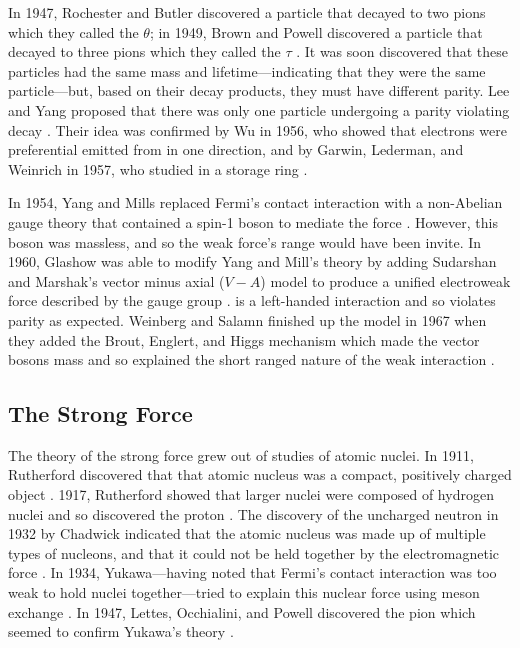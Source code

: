 In 1947, Rochester and Butler discovered a particle that decayed to two pions
which they called the $\theta$; in 1949, Brown and Powell discovered a particle
that decayed to three pions which they called the $\tau$
\cite{Rochester1947}\cite{brown1949}. It was soon discovered that these
particles had the same mass and lifetime---indicating that they were the same
particle---but, based on their decay products, they must have different parity.
Lee and Yang proposed that there was only one particle undergoing a parity
violating decay \cite{lee1956}. Their idea was confirmed by Wu in 1956, who
showed that electrons were preferential emitted from \cobaltsixty in one
direction, and by Garwin, Lederman, and Weinrich in 1957, who studied \pitomunu
in a storage ring \cite{wu1956}\cite{garwin1957}.

In 1954, Yang and Mills replaced Fermi's contact interaction with a non-Abelian
gauge theory that contained a spin-1 boson to mediate the force
\cite{yang1954}. However, this boson was massless, and so the weak force's
range would have been invite. In 1960, Glashow was able to modify Yang and
Mill's theory by adding Sudarshan and Marshak's vector minus axial ($V-A$)
model to produce a unified electroweak force described by the \SUtwoUone gauge
group \cite{glashow1961}\cite{sudarshan1958}. \SUtwo is a left-handed
interaction and so violates parity as expected. Weinberg and Salamn finished up
the model in 1967 when they added the Brout, Englert, and Higgs mechanism which
made the vector bosons mass and so explained the short ranged nature of the
weak interaction
\cite{weinberg1967}\cite{salam1968}\cite{englert1964}\cite{higgs1964}.

\subsection{The Strong Force}
\label{subsection:Strong_force}

The theory of the strong force grew out of studies of atomic nuclei. In 1911,
Rutherford discovered that that atomic nucleus was a compact, positively
charged object \cite{rutherford1911}. 1917, Rutherford showed that larger
nuclei were composed of hydrogen nuclei and so discovered the proton
\cite{rutherford1919}. The discovery of the uncharged neutron in 1932 by
Chadwick indicated that the atomic nucleus was made up of multiple types of
nucleons, and that it could not be held together by the electromagnetic force
\cite{chadwick1932}. In 1934, Yukawa---having noted that Fermi's contact
interaction was too weak to hold nuclei together---tried to explain this
nuclear force using meson exchange \cite{yukawa1935}. In 1947, Lettes,
Occhialini, and Powell discovered the pion which seemed to confirm Yukawa's
theory \cite{lattes1947}.


